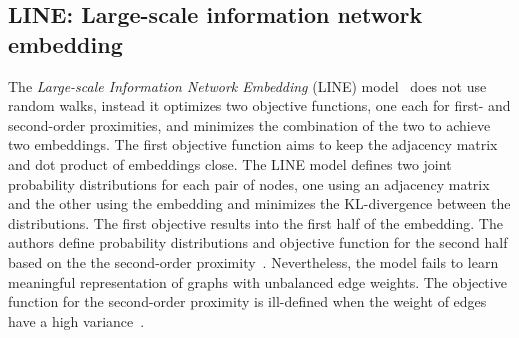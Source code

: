 \subsection{LINE: Large-scale information network embedding}
\label{subsec:LINE}
The \emph{Large-scale Information Network Embedding} (LINE) model~ does not use random walks, instead it optimizes two objective functions, one each for first- and second-order proximities, and minimizes the combination of the two to achieve two embeddings. The first objective function aims to keep the adjacency matrix and dot product of embeddings close. The LINE model defines two joint probability distributions for each pair of nodes, one using an adjacency matrix and the other using the embedding and minimizes the KL-divergence between the distributions. The first objective results into the first half of the embedding. The authors define probability distributions and objective function for the second half based on the the second-order proximity~. Nevertheless, the model fails to learn meaningful representation of graphs with unbalanced edge weights. The objective function for the second-order proximity is ill-defined when the weight of edges have a high variance~.
